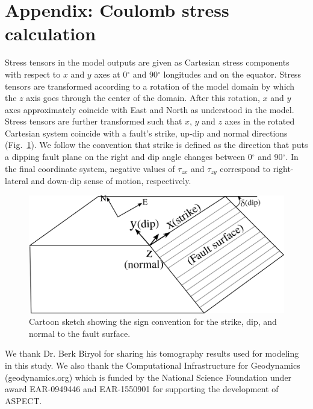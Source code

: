 \documentclass[draft,linenumbers]{agujournal2018}
\begin{document}
\section{Appendix: Coulomb stress calculation}

Stress tensors in the model outputs are given as Cartesian stress components with respect to $x$ and $y$ axes at 0$^{\circ}$ and 90$^{\circ}$ longitudes and on the equator. Stress tensors are transformed according to a rotation of the model domain by which the $z$ axis goes through the center of the domain. After this rotation, $x$ and $y$ axes approximately coincide with East and North as understood in the model. Stress tensors are further transformed such that $x$, $y$ and $z$ axes in the rotated Cartesian system coincide with a fault\rq{}s strike, up-dip and normal directions (Fig.~\ref{signs}). We follow the convention that strike is defined as the direction that puts a dipping fault plane on the right and dip angle changes between 0$^{\circ}$ and 90$^{\circ}$. %
In the final coordinate system, negative values of $\tau_{zx}$ and $\tau_{zy}$ correspond to right-lateral and down-dip sense of motion, respectively.
%
\begin{figure}[h!]
    \centering
    \includegraphics[width=0.5\linewidth]{figures/sign_convention.png}
    \caption{Cartoon sketch showing the sign convention for the strike, dip, and normal to the fault surface. }
    \label{signs}
\end{figure}


\acknowledgments
We thank Dr. Berk Biryol for sharing his tomography results used for modeling in this study. We also thank the Computational Infrastructure for Geodynamics (geodynamics.org) which is funded by the National Science Foundation under award EAR-0949446 and EAR-1550901 for supporting the development of ASPECT.
\end{document}
